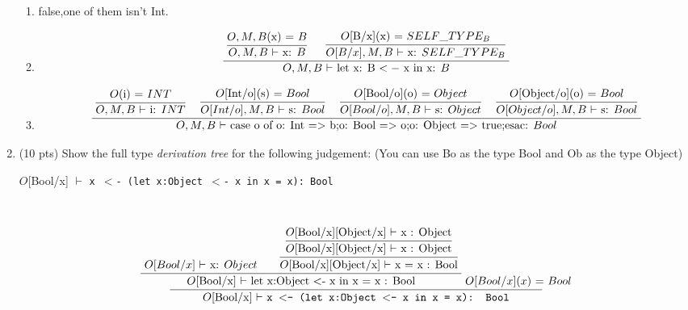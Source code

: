 \documentclass[10pt]{article}
\newcommand{\infertext}[2]{\infer{{\textrm{#1}}}{#2}}
\begin{document}
\begin{enumerate}
\begin{enumerate}
  \item false,one of them isn't Int.

  \item \[\infertext
          {$O,M,B$ $\vdash$ let x: B $<-$ x in x: $B$}
          {\textrm{
              \infertext
              {$O,M,B$ $\vdash$ x: $B$}
              {\textrm{$O,M,B$(x) = $B$}}  
              \ \ \ \ 
              \infertext
              {$O[B/x],M,B$ $\vdash$ x: $SELF\_TYPE_B$}
              {\textrm{$O$[B/x](x) = $SELF\_TYPE_B$}}
          }}            
        \]

  \item \[\infertext
          {$O,M,B$ $\vdash$ case o of o: Int $=>$ b;o: Bool $=>$ o;o: Object $=>$ true;esac: $Bool$}
          {\textrm{
              \infertext
              {$O,M,B$ $\vdash$ i: $INT$}
              {\textrm{$O$(i) = $INT$}}
              \ \ \ 
              \infertext
              {$O[Int/o],M,B$ $\vdash$ s: $Bool$}
              {\textrm{$O$[Int/o](s) = $Bool$}}
              \ \ \ 
              \infertext
              {$O[Bool/o],M,B$ $\vdash$ s: $Object$}
              {\textrm{$O$[Bool/o](o) = $Object$}}
              \ \ \ 
              \infertext
              {$O[Object/o],M,B$ $\vdash$ s: $Bool$}
              {\textrm{$O$[Object/o](o) = $Bool$}}
          }}            
        \]
\end{enumerate}


\medskip

\item (10 pts) Show the full type \emph{derivation tree }for the following judgement:
(You can use Bo as the type Bool and Ob as the type Object)

\begin{center}
$O$[Bool/x] $\vdash$ \tt{x $<$- (let x:Object $<$- x in x = x): Bool}
\end{center}
\



\[\infertext
{$O$[Bool/x] $\vdash$ \tt{x $<$- (let x:Object $<$- x in x = x): Bool}}
{\textrm{
  \infertext
  {$O$[Bool/x] $\vdash$ let x:Object $<$- x in x = x : Bool}
  {\textrm{
  	{{$O[Bool/x]$ $\vdash$ x: $Object$}}
  	\ \ \ \ \ 
    \infertext
    {$O$[Bool/x][Object/x] $\vdash$  x = x : Bool}
    {\textrm{
    	\infertext
    	{$O$[Bool/x][Object/x] $\vdash$  x : Object}
    	{\textrm{$O$[Bool/x][Object/x] $\vdash$  x : Object}}
    }}
  }}
  {$O[Bool/x](x)$ = $Bool$}
}}            
\]
\
\
\



\end{enumerate}
\end{document}
